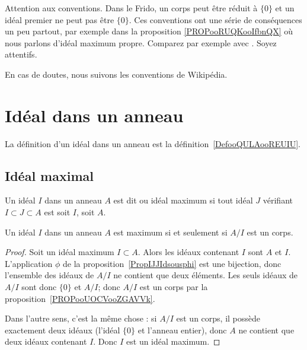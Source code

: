 
Attention aux conventions. Dans le Frido, un corps peut être réduit à \( \{ 0 \}\) et un idéal premier ne peut pas être \( \{ 0 \}\). Ces conventions ont une série de conséquences un peu partout, par exemple dans la proposition \ref{PROPooRUQKooIfbnQX} où nous parlons d'idéal maximum propre. Comparez par exemple avec \cite{ooWEUDooQybvIx}. Soyez attentifs.

En cas de doutes, nous suivons les conventions de Wikipédia.

\section{Idéal dans un anneau}

La définition d'un idéal dans un anneau est la définition~\ref{DefooQULAooREUIU}.

\subsection{Idéal maximal}

\begin{definition}\label{DEFIdealMax}
Un idéal \( I\) dans un anneau \( A \) est dit  ou idéal maximum si tout idéal \( J \) vérifiant \( I \subset J \subset A \) est soit \( I \), soit \( A \).
\end{definition}

\begin{proposition}     \label{PROPooSHHWooCyZPPw}
    Un idéal \( I\) dans un anneau \( A \) est maximum si et seulement si \( A/I\) est un corps.
\end{proposition}

\begin{proof}
    Soit un idéal maximum \( I\subset A\). Alors les idéaux contenant \( I\) sont \( A\) et \( I\). L'application \( \phi\) de la proposition~\ref{PropIJJIdsousphi} est une bijection, donc l'ensemble des idéaux de \( A/I\) ne contient que deux éléments. Les seuls idéaux de \( A/I\) sont donc \( \{ 0 \}\) et \( A/I\); donc \( A/I\) est un corps par la proposition~\ref{PROPooUOCVooZGAVVk}.

    Dans l'autre sens, c'est la même chose : si \( A/I\) est un corps, il possède exactement deux idéaux (l'idéal \( \{ 0 \}\) et l'anneau entier), donc \( A\) ne contient que deux idéaux contenant \( I \). Donc \( I\) est un idéal maximum.
\end{proof}


